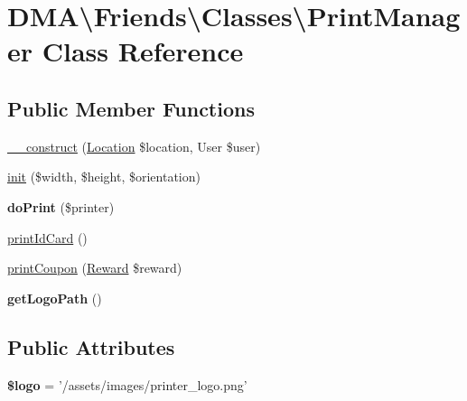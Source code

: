 \hypertarget{classDMA_1_1Friends_1_1Classes_1_1PrintManager}{\section{D\+M\+A\textbackslash{}Friends\textbackslash{}Classes\textbackslash{}Print\+Manager Class Reference}
\label{classDMA_1_1Friends_1_1Classes_1_1PrintManager}
}
\subsection*{Public Member Functions}
\begin{DoxyCompactItemize}
\item 
\hyperlink{classDMA_1_1Friends_1_1Classes_1_1PrintManager_a030f6bbbecf05585a2b111795a6d620f}{\+\_\+\+\_\+construct} (\hyperlink{classDMA_1_1Friends_1_1Models_1_1Location}{Location} \$location, User \$user)
\item 
\hyperlink{classDMA_1_1Friends_1_1Classes_1_1PrintManager_a452bdf8905705bfce94858e232a02d81}{init} (\$width, \$height, \$orientation)
\item 
\hypertarget{classDMA_1_1Friends_1_1Classes_1_1PrintManager_a33e78affc297db7883ecae4e54f76575}{{\bfseries do\+Print} (\$printer)}\label{classDMA_1_1Friends_1_1Classes_1_1PrintManager_a33e78affc297db7883ecae4e54f76575}

\item 
\hyperlink{classDMA_1_1Friends_1_1Classes_1_1PrintManager_a036da54763a007f23c7f477562c47783}{print\+Id\+Card} ()
\item 
\hyperlink{classDMA_1_1Friends_1_1Classes_1_1PrintManager_ab4e5b921c0745a197bb2755145ca78f0}{print\+Coupon} (\hyperlink{classDMA_1_1Friends_1_1Models_1_1Reward}{Reward} \$reward)
\item 
\hypertarget{classDMA_1_1Friends_1_1Classes_1_1PrintManager_a68d263e00a4c7d78c60d4d69bc335fdf}{{\bfseries get\+Logo\+Path} ()}\label{classDMA_1_1Friends_1_1Classes_1_1PrintManager_a68d263e00a4c7d78c60d4d69bc335fdf}

\end{DoxyCompactItemize}
\subsection*{Public Attributes}
\begin{DoxyCompactItemize}
\item 
\hypertarget{classDMA_1_1Friends_1_1Classes_1_1PrintManager_aaf6b4e801f6ebe1c4c3a0266f7de24cf}{{\bfseries \$logo} = '/assets/images/printer\+\_\+logo.\+png'}\label{classDMA_1_1Friends_1_1Classes_1_1PrintManager_aaf6b4e801f6ebe1c4c3a0266f7de24cf}

\end{DoxyCompactItemize}
